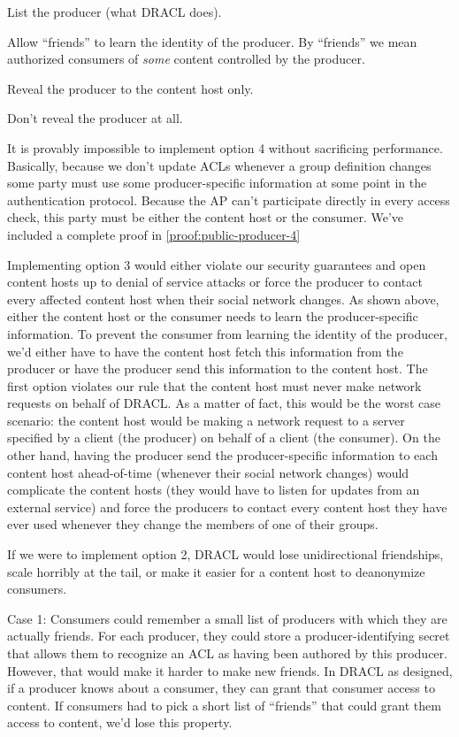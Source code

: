 \documentclass[pdftex,12pt,a4papaer,twoside,notitlepage]{report}
\begin{document}
\begin{compactenum}
\item List the producer (what DRACL does).
\item Allow ``friends'' to learn the identity of the producer. By ``friends'' we
  mean authorized consumers of \emph{some} content controlled by the producer.
\item Reveal the producer to the content host only.
\item Don't reveal the producer at all.
\end{compactenum}

It is provably impossible to implement option 4 without sacrificing performance.
Basically, because we don't update ACLs whenever a group definition changes some
party must use some producer-specific information at some point in the
authentication protocol. Because the AP can't participate directly in every
access check, this party must be either the content host or the consumer. We've
included a complete proof in \cref{proof:public-producer-4}

Implementing option 3 would either violate our security guarantees and open
content hosts up to denial of service attacks or force the producer to contact
every affected content host when their social network changes. As shown above,
either the content host or the consumer needs to learn the producer-specific
information. To prevent the consumer from learning the identity of the producer,
we'd either have to have the content host fetch this information from the
producer or have the producer send this information to the content host. The
first option violates our rule that the content host must never make network
requests on behalf of DRACL\@. As a matter of fact, this would be the worst case
scenario: the content host would be making a network request to a server
specified by a client (the producer) on behalf of a client (the consumer). On
the other hand, having the producer send the producer-specific information to
each content host ahead-of-time (whenever their social network changes) would
complicate the content hosts (they would have to listen for updates from an
external service) and force the producers to contact every content host they
have ever used whenever they change the members of one of their groups.

If we were to implement option 2, DRACL would lose unidirectional friendships,
scale horribly at the tail, or make it easier for a content host to deanonymize
consumers.

Case 1: Consumers could remember a small list of producers with which they are
actually friends. For each producer, they could store a producer-identifying
secret that allows them to recognize an ACL as having been authored by this
producer. However, that would make it harder to make new friends. In DRACL as
designed, if a producer knows about a consumer, they can grant that consumer
access to content. If consumers had to pick a short list of ``friends'' that
could grant them access to content, we'd lose this property.
\end{document}
